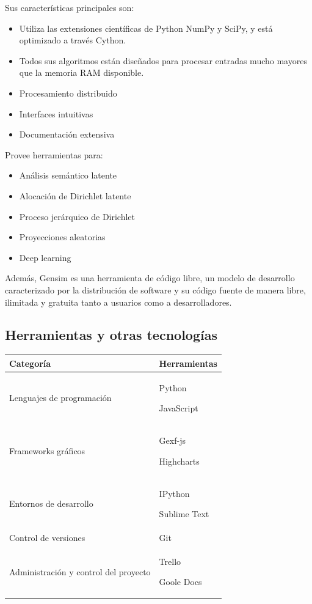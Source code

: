 \documentclass[12pt,a4paper]{article}
\newcommand{\tabitem}{\par\hspace*{\labelsep}\textbullet\hspace*{\labelsep}}
\begin{document}
Sus características principales son:
\begin{itemize}
    \item Utiliza las extensiones científicas de Python NumPy\cite{numpy} 
    y SciPy,\cite{scipy} y está optimizado a través Cython.\cite{cython}
    \item Todos sus algoritmos están diseñados para procesar entradas mucho 
    mayores que la memoria RAM disponible.
    \item Procesamiento distribuido
    \item Interfaces intuitivas
    \item Documentación extensiva
\end{itemize}

Provee herramientas para:
\begin{itemize}
    \item Análisis semántico latente
    \item Alocación de Dirichlet latente
    \item Proceso jerárquico de Dirichlet
    \item Proyecciones aleatorias
    \item Deep learning
\end{itemize}

Además, Gensim es una herramienta de código libre, un modelo de desarrollo caracterizado por la distribución de software y su código fuente de manera libre, ilimitada y gratuita tanto a usuarios como a desarrolladores.

\subsection{Herramientas y otras tecnologías}

\begin{center}
\begin{tabular}{|p{7cm}|p{5cm}|}
    \hline
        \textbf{Categoría} & 
        
        \textbf{Herramientas} \\
    \hline
        Lenguajes de programación & 
        
        \tabitem Python
        \tabitem JavaScript \\
    \hline
        Frameworks gráficos & 
        
        \tabitem Gexf-js\cite{gephi}
        \tabitem Highcharts\cite{highcharts} \\
    \hline
        Entornos de desarrollo & 
        
        \tabitem IPython\cite{ipython}
        \tabitem Sublime Text\cite{sublime} \\
    \hline
        Control de versiones & 
        
        \tabitem Git\cite{git} \\
    \hline
        Administración y control del proyecto & 
        
        \tabitem Trello\cite{trello}
        \tabitem Goole Docs\cite{gdocs} \\
    \hline
\end{tabular}
\end{center}
\end{document}
